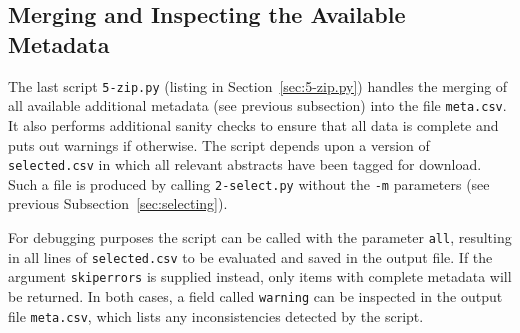 \subsection{Merging and Inspecting the Available Metadata}
The last  script \texttt{5-zip.py} (listing in Section~\ref{sec:5-zip.py}) handles the merging of all available additional metadata (see previous subsection) into the file \texttt{meta.csv}.
It also performs additional sanity checks to ensure that all data is complete and puts out warnings if otherwise.
The script depends upon a version of \texttt{selected.csv} in which all relevant abstracts have been tagged for download. Such a file is produced by calling \texttt{2-select.py} without the \texttt{-m} parameters (see previous Subsection~\ref{sec:selecting}).

For debugging purposes the script can be called with the parameter \texttt{all}, resulting in all lines of \texttt{selected.csv} to be evaluated and saved in the output file. If the argument \texttt{skiperrors} is supplied instead, only items with complete metadata will be returned. In both cases, a field called \texttt{warning} can be inspected in the output file \texttt{meta.csv}, which lists any inconsistencies detected by the script.

